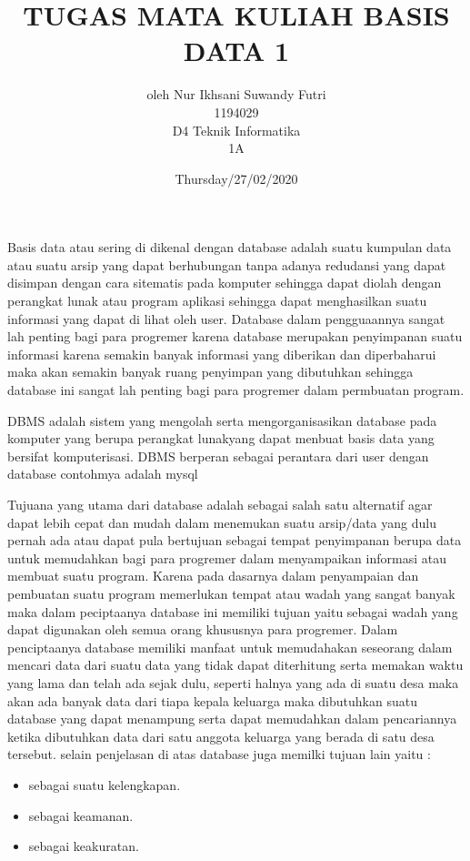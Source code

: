 \documentclass[12pt]{article}
\title{TUGAS MATA KULIAH BASIS DATA 1}
\author{oleh Nur Ikhsani Suwandy Futri\\1194029\\D4 Teknik Informatika\\1A}
\date{Thursday/27/02/2020}
\begin{document}
\maketitle


Basis data atau sering di dikenal dengan database adalah suatu kumpulan data atau suatu arsip yang dapat berhubungan tanpa adanya redudansi yang dapat disimpan dengan cara sitematis pada komputer sehingga dapat diolah dengan perangkat lunak atau program aplikasi  sehingga dapat menghasilkan suatu informasi yang dapat di lihat oleh user. Database dalam pengguaannya sangat lah penting bagi para progremer karena database merupakan penyimpanan suatu informasi karena semakin banyak informasi yang diberikan dan diperbaharui maka akan semakin banyak ruang penyimpan yang dibutuhkan sehingga database ini sangat lah penting bagi para progremer dalam permbuatan program.

DBMS adalah sistem yang mengolah serta mengorganisasikan database pada komputer yang berupa perangkat lunakyang dapat menbuat basis data yang bersifat komputerisasi. DBMS berperan sebagai perantara dari user dengan database contohmya adalah mysql 

Tujuana yang utama dari database adalah sebagai salah satu alternatif agar dapat lebih cepat dan mudah dalam menemukan suatu arsip/data yang dulu pernah ada atau dapat pula bertujuan sebagai tempat penyimpanan berupa data untuk memudahkan bagi para progremer dalam menyampaikan informasi atau membuat suatu program. Karena pada dasarnya dalam penyampaian dan pembuatan suatu program memerlukan tempat atau wadah yang sangat banyak maka dalam peciptaanya database ini memiliki tujuan yaitu sebagai wadah yang dapat digunakan oleh semua orang khususnya para progremer. Dalam penciptaanya database memiliki manfaat untuk memudahakan seseorang dalam mencari data dari  suatu data yang tidak dapat diterhitung serta memakan waktu yang lama dan telah ada sejak dulu, seperti halnya yang ada di suatu desa maka akan ada banyak data dari tiapa kepala keluarga maka dibutuhkan suatu database yang dapat menampung serta dapat memudahkan dalam pencariannya ketika dibutuhkan data dari satu anggota keluarga yang berada di satu desa tersebut.
selain penjelasan di atas database juga memilki tujuan lain yaitu :

\begin{itemize}
  \item sebagai suatu kelengkapan. 
  \item sebagai keamanan. 
  \item sebagai keakuratan.
\end{itemize}
\end{document}
